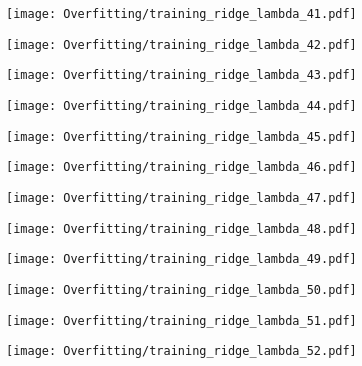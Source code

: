 \documentclass[xcolor=pdftex,dvipsnames,table]{beamer}
\begin{document}
\frame
{
	\begin{center}
		\texttt{[image: Overfitting/training\_ridge\_lambda\_41.pdf]}
	\end{center}
}

\frame
{
	\begin{center}
		\texttt{[image: Overfitting/training\_ridge\_lambda\_42.pdf]}
	\end{center}
}

\frame
{
	\begin{center}
		\texttt{[image: Overfitting/training\_ridge\_lambda\_43.pdf]}
	\end{center}
}

\frame
{
	\begin{center}
		\texttt{[image: Overfitting/training\_ridge\_lambda\_44.pdf]}
	\end{center}
}

\frame
{
	\begin{center}
		\texttt{[image: Overfitting/training\_ridge\_lambda\_45.pdf]}
	\end{center}
}

\frame
{
	\begin{center}
		\texttt{[image: Overfitting/training\_ridge\_lambda\_46.pdf]}
	\end{center}
}

\frame
{
	\begin{center}
		\texttt{[image: Overfitting/training\_ridge\_lambda\_47.pdf]}
	\end{center}
}

\frame
{
	\begin{center}
		\texttt{[image: Overfitting/training\_ridge\_lambda\_48.pdf]}
	\end{center}
}

\frame
{
	\begin{center}
		\texttt{[image: Overfitting/training\_ridge\_lambda\_49.pdf]}
	\end{center}
}

\frame
{
	\begin{center}
		\texttt{[image: Overfitting/training\_ridge\_lambda\_50.pdf]}
	\end{center}
}

\frame
{
	\begin{center}
		\texttt{[image: Overfitting/training\_ridge\_lambda\_51.pdf]}
	\end{center}
}

\frame
{
	\begin{center}
		\texttt{[image: Overfitting/training\_ridge\_lambda\_52.pdf]}
	\end{center}
}
\end{document}

